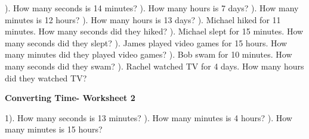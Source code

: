 \documentclass{article}%
\begin{document}
\newline%
). How many seconds is 14 minutes?%
\newline%
\newline%
). How many hours is 7 days?%
\newline%
\newline%
). How many minutes is 12 hours?%
\newline%
\newline%
). How many hours is 13 days?%
\newline%
\newline%
). Michael hiked for 11 minutes. How many seconds did they hiked?%
\newline%
\newline%
). Michael slept for 15 minutes. How many seconds did they slept?%
\newline%
\newline%
). James played video games for 15 hours. How many minutes did they played video games?%
\newline%
\newline%
). Bob swam for 10 minutes. How many seconds did they swam?%
\newline%
\newline%
). Rachel watched TV for 4 days. How many hours did they watched TV?%
\newline%
\newline%
\newline%
\pagebreak%
\large%
\begin{center}%
\textbf{Converting Time- Worksheet 2}%
\newline%
\end{center} \normalsize%
1). How many seconds is 13 minutes?%
\newline%
\newline%
). How many minutes is 4 hours?%
\newline%
\newline%
). How many minutes is 15 hours?%
\newline%
\end{document}
